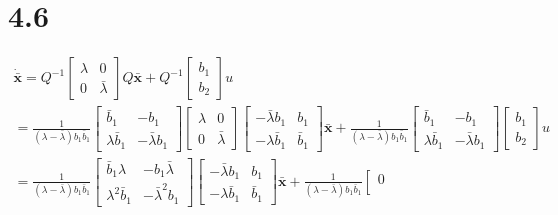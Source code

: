 \documentclass{article}
\begin{document}
\section*{4.6}
$$
\begin{array}{l}
\dot{\bar{\pmb{x}}}=Q^{-1}\left[\begin{array}{cc}
\lambda & 0 \\
0 & \bar{\lambda}
\end{array}\right] Q \bar{\pmb{x}}+Q^{-1}\left[\begin{array}{c}
b_{1} \\
b_{2}
\end{array}\right] u \\
=\frac{1}{(\lambda-\bar{\lambda}) b_{1} \bar{b}_{1}}\left[\begin{array}{cc}
\bar{b}_{1} & -b_{1} \\
\lambda \bar{b}_{1} & -\bar{\lambda} b_{1}
\end{array}\right]\left[\begin{array}{cc}
\lambda & 0 \\
0 & \bar{\lambda}
\end{array}\right]\left[\begin{array}{cc}
-\bar{\lambda} b_{1} & b_{1} \\
-\lambda \bar{b}_{1} & \bar{b}_{1}
\end{array}\right] \bar{\pmb{x}}+\frac{1}{(\lambda-\bar{\lambda}) b_{1} \bar{b}_{1}}\left[\begin{array}{cc}
\bar{b}_{1} & -b_{1} \\
\lambda \bar{b}_{1} & -\bar{\lambda} b_{1}
\end{array}\right]\left[\begin{array}{c}
b_{1} \\
b_{2}
\end{array}\right] u \\
=\frac{1}{(\lambda-\bar{\lambda}) b_{1} \bar{b}_{1}}\left[\begin{array}{cc}
\bar{b}_{1} \lambda & -b_{1} \bar{\lambda} \\
\lambda^{2} \bar{b}_{1} & -\bar{\lambda}^{2} b_{1}
\end{array}\right]\left[\begin{array}{cc}
-\bar{\lambda} b_{1} & b_{1} \\
-\lambda \bar{b}_{1} & \bar{b}_{1}
\end{array}\right] \bar{\pmb{x}}+\frac{1}{(\lambda-\bar{\lambda}) b_{1} \bar{b}_{1}}\left[\begin{array}{c}
0 \\

\end{array}
\end{array}$$
\end{document}
